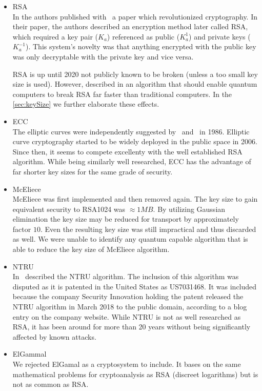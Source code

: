 \begin{itemize}
	\item RSA\\
	In \citeyear{Rivest:1978:MOD:359340.359342} the authors \citeauthor{Rivest:1978:MOD:359340.359342} published with~\cite{Rivest:1978:MOD:359340.359342} a paper which revolutionized cryptography. In their paper, the authors described an encryption method later called RSA, which required a key pair ($K_a$) referenced as public ($K^{1}_a$) and private keys ($K^{-1}_a$). This system's novelty was that anything encrypted with the public key was only decryptable with the private key and vice versa.
	
	RSA is up until 2020 not publicly known to be broken (unless a too small key size is used). 
	However, \citeauthor{Shor97polynomial-timealgorithms} described in \citeyear{Shor97polynomial-timealgorithms} an algorithm that should enable quantum computers to break RSA far faster than traditional computers. In the \cref{sec:keySize} we further elaborate these effects.
	\item ECC\\
	The elliptic curves were independently suggested by~\cite{Miller1986} and~\cite{Koblitz04guideto} in 1986. Elliptic curve cryptography started to be widely deployed in the public space in 2006. Since then, it seems to compete excellenty with the well established RSA algorithm. While being similarly well researched, ECC has the advantage of far shorter key sizes for the same grade of security.
	\item McEliece\\
	McEliece was first implemented and then removed again. The key size to gain equivalent security to RSA1024 was $\approx 1MB$. By utilizing Gaussian elimination the key size may be reduced for transport by approximately factor $10$. Even the resulting key size was still impractical and thus discarded as well. We were unable to identify any quantum capable algorithm that is able to reduce the key size of McEliece algorithm.
	\item NTRU\\
	In~\cite{Hoffstein1998} \citeauthor{Hoffstein1998} described the NTRU algorithm. The inclusion of this algorithm was disputed as it is patented in the United States as US7031468. It was included because the company Security Innovation holding the patent released the NTRU algorithm in March  2018 to the public domain, according to a blog entry on the company website. While NTRU is not as well researched as RSA, it has been around for more than 20 years without being significantly affected by known attacks.
	\item ElGammal\\
	We rejected ElGamal as a cryptosystem to include. It bases on the same mathematical problems for cryptoanalysis as RSA (discreet logarithms) but is not as common as RSA.
\end{itemize}


